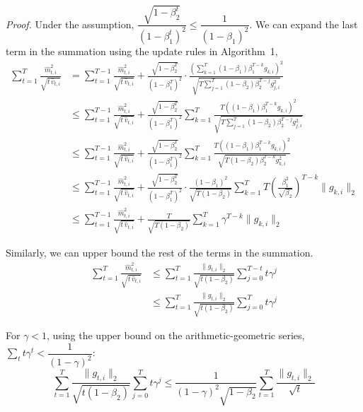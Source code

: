\documentclass[11pt]{article}
\begin{document}
\noindent\emph{Proof.} Under the assumption,
$\dfrac{\sqrt{1 - \beta_2^t}}{(1 - \beta_1^t)^2}
 \leq \dfrac{1}{(1 - \beta_1)^2}$.
We can expand the last term in the summation using the update
rules in Algorithm~1,
\begin{align*}
\sum_{t=1}^{T} \frac{\widehat{m}_{t,i}^2}{\sqrt{t\,\widehat{v}_{t,i}}}
 &= \sum_{t=1}^{T-1} \frac{\widehat{m}_{t,i}^2}{\sqrt{t\,\widehat{v}_{t,i}}}
    + \frac{\sqrt{1 - \beta_2^T}}{(1 - \beta_1^T)^2}
      \cdot \frac{\left(\sum_{k=1}^{T}(1 - \beta_1)\beta_1^{T-k} g_{k,i}\right)^{\!2}}
                 {\sqrt{T \sum_{j=1}^{T}(1 - \beta_2)\beta_2^{T-j} g_{j,i}^2}} \\[0.4em]
 &\leq \sum_{t=1}^{T-1} \frac{\widehat{m}_{t,i}^2}{\sqrt{t\,\widehat{v}_{t,i}}}
    + \frac{\sqrt{1 - \beta_2^T}}{(1 - \beta_1^T)^2}
      \sum_{k=1}^{T} \frac{T\left((1 - \beta_1)\beta_1^{T-k} g_{k,i}\right)^{2}}
                           {\sqrt{T \sum_{j=1}^{T}(1 - \beta_2)\beta_2^{T-j} g_{j,i}^2}} \\[0.4em]
 &\leq \sum_{t=1}^{T-1} \frac{\widehat{m}_{t,i}^2}{\sqrt{t\,\widehat{v}_{t,i}}}
    + \frac{\sqrt{1 - \beta_2^T}}{(1 - \beta_1^T)^2}
      \sum_{k=1}^{T} \frac{T\left((1 - \beta_1)\beta_1^{T-k} g_{k,i}\right)^{2}}
                           {\sqrt{T(1 - \beta_2)\beta_2^{T-k} g_{k,i}^2}} \\[0.4em]
 &\leq \sum_{t=1}^{T-1} \frac{\widehat{m}_{t,i}^2}{\sqrt{t\,\widehat{v}_{t,i}}}
    + \frac{\sqrt{1 - \beta_2^T}}{(1 - \beta_1^T)^2}
      \cdot \frac{(1 - \beta_1)^2}{\sqrt{T(1 - \beta_2)}}
      \sum_{k=1}^{T} T\!\left(\frac{\beta_1^2}{\sqrt{\beta_2}}\right)^{\!T-k}
      \|g_{k,i}\|_2 \\[0.4em]
 &\leq \sum_{t=1}^{T-1} \frac{\widehat{m}_{t,i}^2}{\sqrt{t\,\widehat{v}_{t,i}}}
    + \frac{T}{\sqrt{T(1 - \beta_2)}}
      \sum_{k=1}^{T} \gamma^{T-k} \|g_{k,i}\|_2
\end{align*}

\noindent
Similarly, we can upper bound the rest of the terms in the
summation.
\begin{align*}
\sum_{t=1}^{T} \frac{\widehat{m}_{t,i}^2}{\sqrt{t\,\widehat{v}_{t,i}}}
 &\leq \sum_{t=1}^{T} \frac{\|g_{t,i}\|_2}{\sqrt{t(1 - \beta_2)}}
       \sum_{j=0}^{T-t} t\gamma^{j} \\
 &\leq \sum_{t=1}^{T} \frac{\|g_{t,i}\|_2}{\sqrt{t(1 - \beta_2)}}
       \sum_{j=0}^{T} t\gamma^{j}
\end{align*}

\noindent
For $\gamma < 1$, using the upper bound on the
arithmetic-geometric series,
$\sum_t t\gamma^{t} < \dfrac{1}{(1 - \gamma)^2}$:
\[
\sum_{t=1}^{T} \frac{\|g_{t,i}\|_2}{\sqrt{t(1 - \beta_2)}}
  \sum_{j=0}^{T} t\gamma^{j}
 \leq \frac{1}{(1 - \gamma)^2 \sqrt{1 - \beta_2}}
      \sum_{t=1}^{T} \frac{\|g_{t,i}\|_2}{\sqrt{t}}
\]
\end{document}
